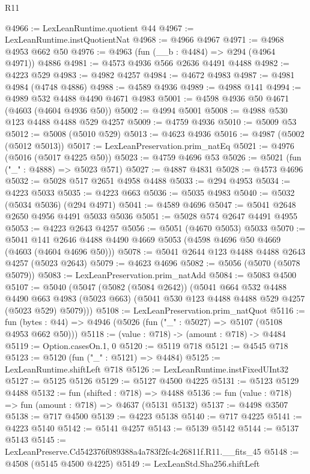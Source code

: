 \begin{lexlean}{R11}
\begin{coremodule}
@4966 := LexLeanRuntime.quotient @44
@4967 := LexLeanRuntime.instQuotientNat
@4968 := @4966 @4967
@4971 := @4968 @4953 @662 @50
@4976 := @4963 (fun (__b : @4484) => @294 (@4964 @4971)) @4886
@4981 := @4573 @4936 @566 @2636 @4491 @4488
@4982 := @4223 @529
@4983 := @4982 @4257
@4984 := @4672 @4983
@4987 := @4981 @4984 (@4748 @4886)
@4988 := @4589 @4936
@4989 := @4988 @141
@4994 := @4989 @532 @4488 @4490 @4671 @4983
@5001 := @4598 @4936 @50 @4671 (@4603 (@4604 @4936 @50))
@5002 := @4994 @5001
@5008 := @4988 @530 @123 @4488 @4488 @529 @4257
@5009 := @4759 @4936
@5010 := @5009 @53
@5012 := @5008 (@5010 @529)
@5013 := @4623 @4936
@5016 := @4987 (@5002 (@5012 @5013))
@5017 := LexLeanPreservation.prim_natEq
@5021 := @4976 (@5016 (@5017 @4225 @50))
@5023 := @4759 @4696 @53
@5026 := @5021 (fun ("_" : @4888) => @5023 @571)
@5027 := @4887 @4831
@5028 := @4573 @4696
@5032 := @5028 @517 @2651 @4958 @4488
@5033 := @294 @4953
@5034 := @4223 @5033
@5035 := @4223 @663
@5036 := @5035 @4983
@5040 := @5032 (@5034 @5036) (@294 @4971)
@5041 := @4589 @4696
@5047 := @5041 @2648 @2650 @4956 @4491 @5033 @5036
@5051 := @5028 @574 @2647 @4491 @4955
@5053 := @4223 @2643 @4257
@5056 := @5051 (@4670 @5053) @5033
@5070 := @5041 @141 @2646 @4488 @4490 @4669 @5053 (@4598 @4696 @50 @4669 (@4603 (@4604 @4696 @50)))
@5078 := @5041 @2644 @123 @4488 @4488 @2643 @4257 (@5023 @2643)
@5079 := @4623 @4696
@5082 := @5056 (@5070 (@5078 @5079))
@5083 := LexLeanPreservation.prim_natAdd
@5084 := @5083 @4500
@5107 := @5040
    (@5047
      (@5082 (@5084 @2642))
      (@5041
        @664
        @532
        @4488
        @4490
        @663
        @4983
        (@5023 @663)
        (@5041 @530 @123 @4488 @4488 @529 @4257 (@5023 @529) @5079)))
@5108 := LexLeanPreservation.prim_natQuot
@5116 := fun (bytes : @44) => @4946 (@5026 (fun ("_" : @5027) => @5107 (@5108 @4953 @662 @50)))
@5118 := (value : @718) -> (amount : @718) -> @4484
@5119 := Option.casesOn.{1, 0}
@5120 := @5119 @718
@5121 := @4545 @718
@5123 := @5120 (fun ("_" : @5121) => @4484)
@5125 := LexLeanRuntime.shiftLeft @718
@5126 := LexLeanRuntime.instFixedUInt32
@5127 := @5125 @5126
@5129 := @5127 @4500 @4225
@5131 := @5123 @5129 @4488
@5132 := fun (shifted : @718) => @4488
@5136 := fun (value : @718) => fun (amount : @718) => @4637 (@5131 @5132)
@5137 := @4498 @3507
@5138 := @717 @4500
@5139 := @4223 @5138
@5140 := @717 @4225
@5141 := @4223 @5140
@5142 := @5141 @4257
@5143 := @5139 @5142
@5144 := @5137 @5143
@5145 := LexLeanPreserve.Cd542376f089388a4a783f2fc4c26811f.R11.__fits_45
@5148 := @4508 (@5145 @4500 @4225)
@5149 := LexLeanStd.Sha256.shiftLeft

\end{coremodule}
\end{lexlean}
